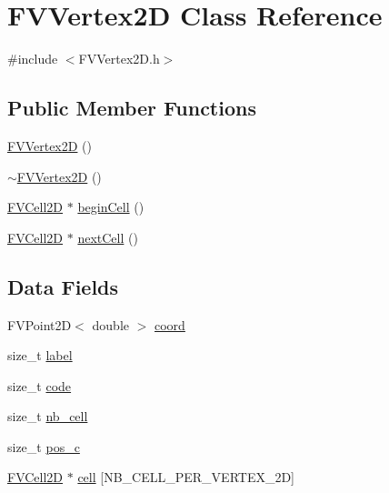 \hypertarget{classFVVertex2D}{
\section{FVVertex2D Class Reference}
\label{d5/dbb/classFVVertex2D}
}


{\ttfamily \#include $<$FVVertex2D.h$>$}

\subsection*{Public Member Functions}
\begin{DoxyCompactItemize}
\item 
\hyperlink{classFVVertex2D_a9d6a1385efe0320a38bb8e7b5d87f8e4}{FVVertex2D} ()
\item 
\hyperlink{classFVVertex2D_afa2c95179a8d4d9b8e8fdc9b27d820c3}{$\sim$FVVertex2D} ()
\item 
\hyperlink{classFVCell2D}{FVCell2D} $\ast$ \hyperlink{classFVVertex2D_aada085185bbf330d68dca62b7f2eda47}{beginCell} ()
\item 
\hyperlink{classFVCell2D}{FVCell2D} $\ast$ \hyperlink{classFVVertex2D_af234b36adb0327d1f46f5a002f47171d}{nextCell} ()
\end{DoxyCompactItemize}
\subsection*{Data Fields}
\begin{DoxyCompactItemize}
\item 
FVPoint2D$<$ double $>$ \hyperlink{classFVVertex2D_a7df51306f5a4f82e51aec0d168ce5ac2}{coord}
\item 
size\_\-t \hyperlink{classFVVertex2D_a1ec973463c76e6d9e91160720959ad68}{label}
\item 
size\_\-t \hyperlink{classFVVertex2D_acf258c3b3328a96e3ee1e3b875b7874f}{code}
\item 
size\_\-t \hyperlink{classFVVertex2D_a1a5a11cfc8bbaa0cf132759c0382da70}{nb\_\-cell}
\item 
size\_\-t \hyperlink{classFVVertex2D_a4a8207cde821dc3afcfb83f8645d62ef}{pos\_\-c}
\item 
\hyperlink{classFVCell2D}{FVCell2D} $\ast$ \hyperlink{classFVVertex2D_a2e88df41fb480687d9c7ed51db6f0226}{cell} \mbox{[}NB\_\-CELL\_\-PER\_\-VERTEX\_\-2D\mbox{]}
\end{DoxyCompactItemize}


